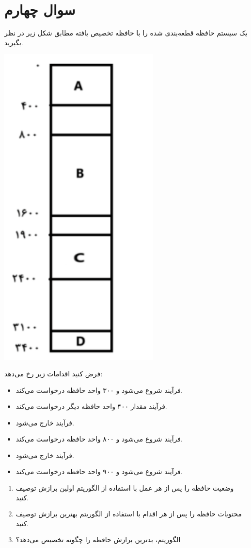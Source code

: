 \section{سوال چهارم}

یک سیستم حافظه قطعه‌بندی شده را با حافظه تخصیص یافته مطابق شکل زیر در نظر بگیرید.

\begin{center}
	\includegraphics*[width=0.2\linewidth]{pics/img1.png}
\end{center}




فرض کنید اقدامات زیر رخ می‌دهد:

\begin{itemize}
	\item فرآیند  شروع می‌شود و ۳۰۰ واحد حافظه درخواست می‌کند.
	\item فرآیند  مقدار ۴۰۰ واحد حافظه دیگر درخواست می‌کند.
	\item فرآیند  خارج می‌شود.
	\item فرآیند  شروع می‌شود و ۸۰۰ واحد حافظه درخواست می‌کند.
	\item فرآیند  خارج می‌شود.
	\item فرآیند  شروع می‌شود و ۹۰۰ واحد حافظه درخواست می‌کند.
\end{itemize}



\begin{enumerate}
	\item وضعیت حافظه را پس از هر عمل با استفاده از الگوریتم اولین برازش توصیف کنید.
	
	
	\item محتویات حافظه را پس از هر اقدام با استفاده از الگوریتم بهترین برازش توصیف کنید.
	
	
	\item الگوریتم، بدترین برازش حافظه را چگونه تخصیص می‌دهد؟
\end{enumerate}
